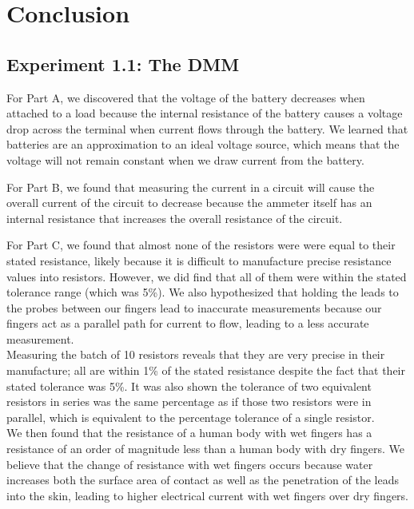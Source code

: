\documentclass[10pt]{article}
\begin{document}
	\medskip
	
	
	
	\section{Conclusion}
	\subsection{Experiment 1.1: The DMM}
	\qquad For Part A, we discovered that the voltage of the battery decreases when attached to a load because the internal resistance of the battery causes a voltage drop across the terminal when current flows through the battery. We learned that batteries are an approximation to an ideal voltage source, which means that the voltage will not remain constant when we draw current from the battery. \newline
	
	For Part B, we found that measuring the current in a circuit will cause the overall current of the circuit to decrease because the ammeter itself has an internal resistance that increases the overall resistance of the circuit. \newline
	
	For Part C, we found that almost none of the resistors were were equal to their stated resistance, likely because it is difficult to manufacture precise resistance values into resistors. However, we did find that all of them were within the stated tolerance range (which was 5\%). We also hypothesized that holding the leads to the probes between our fingers lead to inaccurate measurements because our fingers act as a parallel path for current to flow, leading to a less accurate measurement. \\
	Measuring the batch of 10 resistors reveals that they are very precise in their manufacture; all are within 1\% of the stated resistance despite the fact that their stated tolerance was 5\%. It was also shown the tolerance of two equivalent resistors in series was the same percentage as if those two resistors were in parallel, which is equivalent to the percentage tolerance of a single resistor.\\
	We then found that the resistance of a human body with wet fingers has a resistance of an order of magnitude less than a human body with dry fingers. We believe that the change of resistance with wet fingers occurs because water increases both the surface area of contact as well as the penetration of the leads into the skin, leading to higher electrical current with wet fingers over dry fingers. 
	\newline
	
\end{document}

